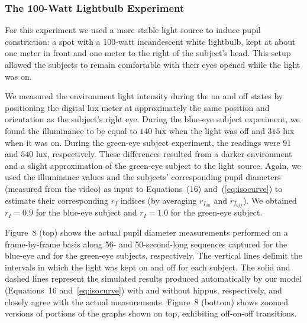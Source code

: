 \documentclass{acmtog}
\begin{document}
\subsubsection{The 100-Watt Lightbulb Experiment}
\label{sec:luxMeterExperiment}
For this experiment we used a more stable light source to induce pupil constriction: 
a spot with a 100-watt incandescent white lightbulb, kept at about one meter in front and one meter to the right of the
subject's head. This setup allowed the subjects to remain comfortable with their eyes opened while the light was on.

We measured the environment light intensity during the {on} and {off} states by positioning the digital lux meter at
approximately the same position and orientation as the subject's right eye. During the blue-eye subject experiment, we
found the illuminance to be equal to $140$ lux when the light was off and $315$ lux when it was on. During the green-eye
subject experiment, the readings were $91$ and $540$ lux, respectively. These differences resulted from a darker
environment and a slight approximation of the green-eye subject to the light source. Again, we used the illuminance values
and the subjects' corresponding pupil diameters (measured from the video) as input to Equations~(16)
and~(\ref{eq:isocurve}) to estimate their corresponding $r_I$ indices (by averaging $r_{I_{on}}$ and $r_{I_{off}}$). We
obtained $r_I = 0.9$ for the blue-eye subject and $r_I = 1.0$ for the green-eye subject. 

Figure~8 (top) shows the actual pupil diameter measurements performed on a
frame-by-frame basis along 56- and 50-second-long sequences captured for the blue-eye and for the green-eye subjects,
respectively. The vertical lines delimit the intervals in which the light was kept {on} and {off} for each subject. The
solid and dashed lines represent the simulated results produced automatically by our model
(Equations~16 and~\ref{eq:isocurve}) with and without hippus, respectively, and closely agree with
the actual measurements. 
Figure~8 (bottom) shows zoomed versions of portions of
the graphs shown on top, exhibiting {off-on-off} transitions.    
\end{document}
